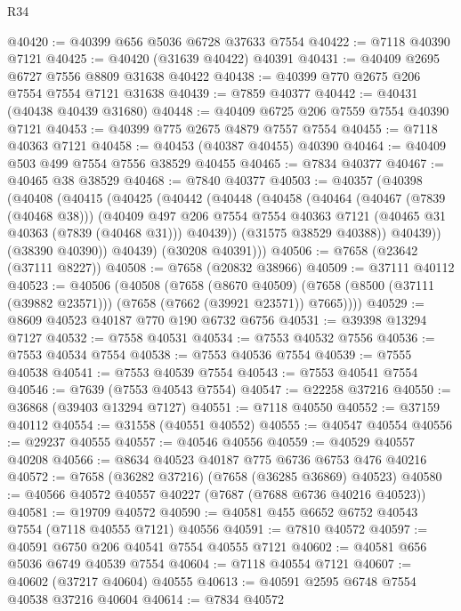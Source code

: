 \begin{lexlean}{R34}
\begin{coremodule}
@40420 := @40399 @656 @5036 @6728 @37633 @7554
@40422 := @7118 @40390 @7121
@40425 := @40420 (@31639 @40422) @40391
@40431 := @40409 @2695 @6727 @7556 @8809 @31638 @40422
@40438 := @40399 @770 @2675 @206 @7554 @7554 @7121 @31638
@40439 := @7859 @40377
@40442 := @40431 (@40438 @40439 @31680)
@40448 := @40409 @6725 @206 @7559 @7554 @40390 @7121
@40453 := @40399 @775 @2675 @4879 @7557 @7554
@40455 := @7118 @40363 @7121
@40458 := @40453 (@40387 @40455) @40390
@40464 := @40409 @503 @499 @7554 @7556 @38529 @40455
@40465 := @7834 @40377
@40467 := @40465 @38 @38529
@40468 := @7840 @40377
@40503 := @40357
    (@40398
      (@40408
        (@40415
          (@40425
            (@40442
              (@40448
                (@40458
                  (@40464
                    (@40467 (@7839 (@40468 @38)))
                    (@40409
                      @497
                      @206
                      @7554
                      @7554
                      @40363
                      @7121
                      (@40465 @31 @40363 (@7839 (@40468 @31)))
                      @40439))
                  (@31575 @38529 @40388))
                @40439))
            (@38390 @40390))
          @40439)
        (@30208 @40391)))
@40506 := @7658 (@23642 (@37111 @8227))
@40508 := @7658 (@20832 @38966)
@40509 := @37111 @40112
@40523 := @40506
    (@40508
      (@7658
        (@8670 @40509)
        (@7658 (@8500 (@37111 (@39882 @23571))) (@7658 (@7662 (@39921 @23571)) @7665))))
@40529 := @8609 @40523 @40187 @770 @190 @6732 @6756
@40531 := @39398 @13294 @7127
@40532 := @7558 @40531
@40534 := @7553 @40532 @7556
@40536 := @7553 @40534 @7554
@40538 := @7553 @40536 @7554
@40539 := @7555 @40538
@40541 := @7553 @40539 @7554
@40543 := @7553 @40541 @7554
@40546 := @7639 (@7553 @40543 @7554)
@40547 := @22258 @37216
@40550 := @36868 (@39403 @13294 @7127)
@40551 := @7118 @40550
@40552 := @37159 @40112
@40554 := @31558 (@40551 @40552)
@40555 := @40547 @40554
@40556 := @29237 @40555
@40557 := @40546 @40556
@40559 := @40529 @40557 @40208
@40566 := @8634 @40523 @40187 @775 @6736 @6753 @476 @40216
@40572 := @7658 (@36282 @37216) (@7658 (@36285 @36869) @40523)
@40580 := @40566 @40572 @40557 @40227 (@7687 (@7688 @6736 @40216 @40523))
@40581 := @19709 @40572
@40590 := @40581 @455 @6652 @6752 @40543 @7554 (@7118 @40555 @7121) @40556
@40591 := @7810 @40572
@40597 := @40591 @6750 @206 @40541 @7554 @40555 @7121
@40602 := @40581 @656 @5036 @6749 @40539 @7554
@40604 := @7118 @40554 @7121
@40607 := @40602 (@37217 @40604) @40555
@40613 := @40591 @2595 @6748 @7554 @40538 @37216 @40604
@40614 := @7834 @40572

\end{coremodule}
\end{lexlean}
